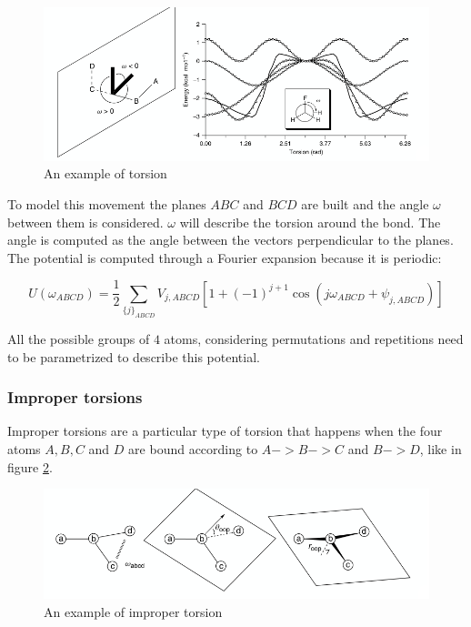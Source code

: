	\begin{figure}[H]
		\includegraphics[width=\textwidth]{torsions}
		\caption{An example of torsion}
		\label{fig:torsions}
	\end{figure}

	To model this movement the planes $ABC$ and $BCD$ are built and the angle $\omega$ between them is considered.
	$\omega$ will describe the torsion around the bond.
	The angle is computed as the angle between the vectors perpendicular to the planes.
	The potential is computed through a Fourier expansion because it is periodic:

	$$U(\omega_{ABCD}) = \frac{1}{2}\sum\limits_{\{j\}_{ABCD}}V_{j,ABCD}\left[1+(-1)^{j+1}\cos(j\omega_{ABCD}+\psi_{j,ABCD})\right]$$

	All the possible groups of $4$ atoms, considering permutations and repetitions need to be parametrized to describe this potential.

		\subsubsection{Improper torsions}
		Improper torsions are a particular type of torsion that happens when the four atoms $A, B, C$ and $D$ are bound according to $A->B->C$ and $B->D$, like in figure \ref{fig:improper-torsions}.

		\begin{figure}[H]
			\includegraphics[width=\textwidth]{improper-torsions}
			\caption{An example of improper torsion}
			\label{fig:improper-torsions}
		\end{figure}

